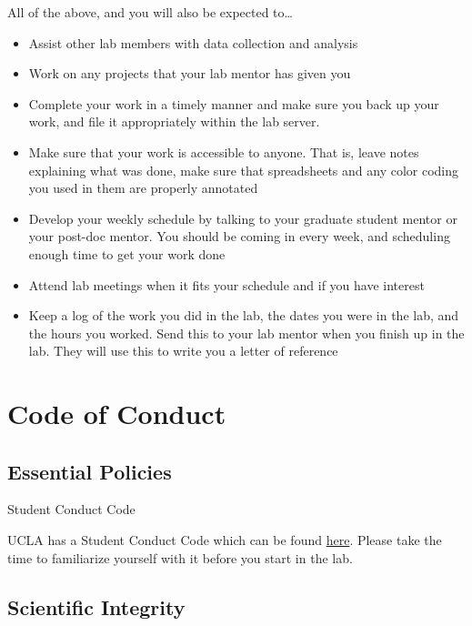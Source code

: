 \documentclass[]{book}
\providecommand{\tightlist}{%
  \setlength{\itemsep}{0pt}\setlength{\parskip}{0pt}}
\begin{document}
All of the above, and you will also be expected to\ldots{}

\begin{itemize}
\tightlist
\item
  Assist other lab members with data collection and analysis
\item
  Work on any projects that your lab mentor has given you
\item
  Complete your work in a timely manner and make sure you back up your work, and file it appropriately within the lab server.
\item
  Make sure that your work is accessible to anyone. That is, leave notes explaining what was done, make sure that spreadsheets and any color coding you used in them are properly annotated
\item
  Develop your weekly schedule by talking to your graduate student mentor or your post-doc mentor. You should be coming in every week, and scheduling enough time to get your work done
\item
  Attend lab meetings when it fits your schedule and if you have interest
\item
  Keep a log of the work you did in the lab, the dates you were in the lab, and the hours you worked. Send this to your lab mentor when you finish up in the lab. They will use this to write you a letter of reference
\end{itemize}

\hypertarget{code-of-conduct}{%
\chapter{Code of Conduct}\label{code-of-conduct}}

\hypertarget{essential-policies}{%
\section{Essential Policies}\label{essential-policies}}

Student Conduct Code

UCLA has a Student Conduct Code which can be found \href{https://www.deanofstudents.ucla.edu/Individual-Student-Code}{here}. Please take the time to familiarize yourself with it before you start in the lab.

\hypertarget{scientific-integrity}{%
\section{Scientific Integrity}\label{scientific-integrity}}
\end{document}
